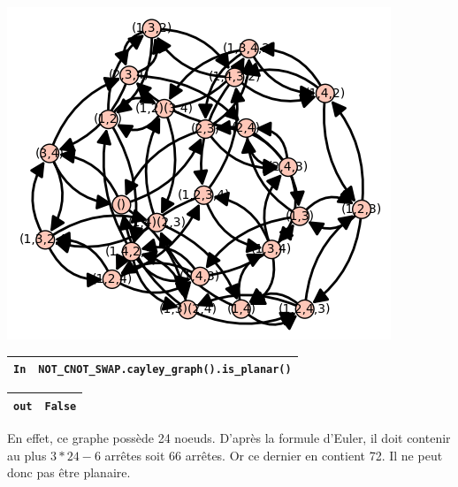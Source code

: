 \documentclass[titlepage]{article}
\begin{document}
    \begin{center}
        \includegraphics[scale=0.5]{q10.png}
    \end{center}

    \begin{tabularx}{11.5cm}{|p{0.60cm}|X|}
        \hline
        \verb|In|
        & 
        \verb|NOT_CNOT_SWAP.cayley_graph().is_planar()|
        \\
        \hline
    \end{tabularx}\newline
    \begin{tabularx}{11.5cm}{|p{0.60cm}|X|}
        \hline
        \verb|out|
        & 
        \verb|False|
        \\
        \hline
    \end{tabularx}\newline

    En effet, ce graphe possède 24 noeuds. D'après la formule d'Euler, il doit contenir au plus $3*24-6$ arrêtes soit 66 arrêtes. Or ce dernier en contient 72. Il ne peut donc pas être planaire.
\end{document}
